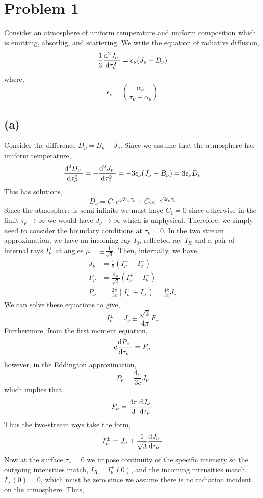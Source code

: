 \documentclass[12pt]{article}
\begin{document}

\section{Problem 1}

Consider an atmosphere of uniform temperature and uniform composition which is emitting, absorbig, and scattering. We write the equation of radiative diffusion,
\[ \frac{1}{3} \frac{\mathrm{d}^{2} J_\nu \:}{\mathrm{d} \tau_\nu^{2} \;} = \epsilon_\nu (J_\nu - B_\nu) \]
where,
\[ \epsilon_\nu = \left( \frac{\alpha_\nu}{\sigma_\nu + \alpha_\nu} \right) \]


\subsection*{(a)}

Consider the difference $D_\nu = B_\nu - J_\nu$. Since we assume that the atmosphere has uniform temperature,
\[ \frac{\mathrm{d}^{2} D_\nu \:}{\mathrm{d} \tau_\nu^{2} \;} = - \frac{\mathrm{d}^{2} J_\nu \:}{\mathrm{d} \tau_\nu^{2} \;} = - 3 \epsilon_\nu (J_\nu - B_\nu) = 3 \epsilon_\nu D_\nu \]
This has solutions,
\[ D_\nu = C_1 e^{\sqrt{3 \epsilon_\nu} \tau_\nu} + C_2 e^{-\sqrt{3 \epsilon_\nu} \tau_\nu} \]
Since the atmosphere is semi-infinite we must have $C_1 = 0$ since otherwise in the limit $\tau_\nu \to \infty$ we would have $J_\nu \to \infty$ which is unphysical. Therefore, we simply need to consider the boundary conditions at $\tau_\nu = 0$.
In the two stream approximation, we have an incoming ray $I_0$, reflected ray $I_R$ and a pair of internal rays $I^{\pm}_\nu$ at angles $\mu = \pm \frac{1}{\sqrt{3}}$. 
Then, internally, we have,
\begin{align*}
J_\nu &= \tfrac{1}{2} (I_\nu^+ + I_\nu^-)
\\
F_\nu & = \frac{2 \pi}{\sqrt{3}} (I_\nu^+ - I_\nu^-)
\\
P_\nu & = \frac{2 \pi}{3c} (I_\nu^+ + I_\nu^-) = \frac{4 \pi}{3c} J_\nu
\end{align*} 
We can solve these equations to give,
\[ I^\pm_\nu = J_\nu \pm \frac{\sqrt{3}}{4 \pi} F_\nu \] 
Furthermore, from the first moment equation,
\[ c \frac{\mathrm{d} P_\nu \;}{\mathrm{d} \tau_\nu \;} = F_\nu \]
however, in the Eddington approximation,
\[ P_\nu = \frac{4 \pi}{3 c} J_\nu \]
which implies that,
\[ F_\nu = \frac{4 \pi}{3} \frac{\mathrm{d} J_\nu \;}{\mathrm{d} \tau_\nu \;} \]
Thus the two-stream rays take the form,
\[ I^\pm_\nu = J_\nu \pm \frac{1}{\sqrt{3}} \frac{\mathrm{d} J_\nu \;}{\mathrm{d} \tau_\nu \;} \] 
Now at the surface $\tau_\nu = 0$ we impose continuity of the specific intensity so the outgoing intensities match, $I_R = I^+_\nu(0)$, and the incoming intensities match, $I^-_\nu(0) = 0$, which must be zero since we assume there is no radiation incident on the atmosphere. Thus,
\end{document}
